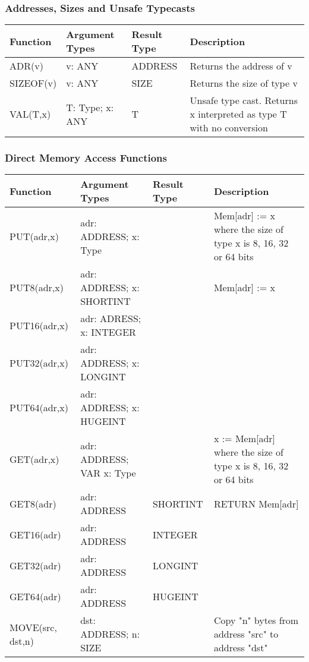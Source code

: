 \documentclass[a4paper,11pt]{article}
\begin{document}
\subsubsection{Addresses, Sizes and Unsafe Typecasts}
\begin{longtable}{|p{3cm}|p{3cm}|p{2cm}|p{6cm}|}
\hline
Function & Argument Types & Result Type & Description \\
\hline\hline
\endhead
ADR(v) & v: ANY & ADDRESS & Returns the address of v \\
\hline
SIZEOF(v) & v: ANY & SIZE & Returns the size of type v \\
\hline
VAL(T,x) & T: Type; x: ANY & T & Unsafe type cast. Returns x interpreted as type T with no conversion \\
\hline
\end{longtable}

\subsubsection{Direct Memory Access Functions}
\begin{longtable}{|p{3cm}|p{3cm}|p{2cm}|p{6cm}|}
\hline
Function & Argument Types & Result Type & Description \\
\hline\hline
\endhead
PUT(adr,x) & adr: ADDRESS; x: Type & & Mem[adr] := x where the size of type x is 8, 16, 32 or 64 bits \\
\hline
PUT8(adr,x) & adr: ADDRESS; x: SHORTINT & & Mem[adr] := x \\
PUT16(adr,x) & adr: ADRESS; x: INTEGER && \\
PUT32(adr,x) & adr: ADDRESS; x: LONGINT && \\
PUT64(adr,x) & adr: ADDRESS; x: HUGEINT && \\
\hline
GET(adr,x) & adr: ADDRESS; VAR x: Type & & x := Mem[adr] where the size of type x is 8, 16, 32 or 64 bits \\
\hline
GET8(adr) & adr: ADDRESS & SHORTINT & RETURN Mem[adr] \\
GET16(adr) & adr: ADDRESS & INTEGER &\\
GET32(adr) & adr: ADDRESS & LONGINT & \\
GET64(adr) & adr: ADDRESS & HUGEINT & \\
\hline
MOVE(src, dst,n) & dst: ADDRESS; n: SIZE & & Copy "n" bytes from address "src" to address "dst" \\
\hline \end{longtable}
\end{document}
